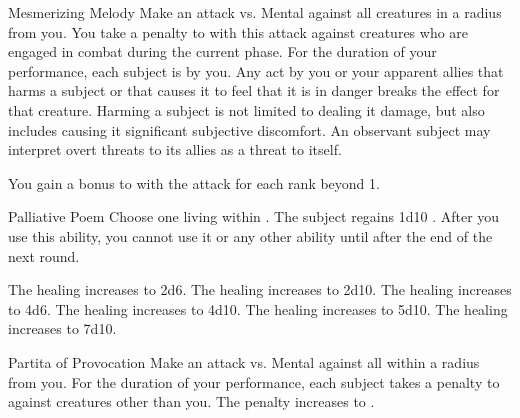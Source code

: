 {            \begin{durationability}{Mesmerizing Melody}
                \rankline
                Make an attack vs. Mental against all creatures in a \largearea radius from you.
                You take a  penalty to  with this attack against creatures who are engaged in combat during the current phase.
                \hit For the duration of your performance, each subject is \fascinated by you.
                Any act by you or your apparent allies that harms a subject or that causes it to feel that it is in danger breaks the effect for that creature.
                Harming a subject is not limited to dealing it damage, but also includes causing it significant subjective discomfort.
                An observant subject may interpret overt threats to its allies as a threat to itself.

                \rankline
                You gain a  bonus to  with the attack for each rank beyond 1.
            \end{durationability}

            \begin{instantability}{Palliative Poem}
                \rankline
                Choose one living  within \shortrange.
                The subject regains 1d10 \add {} .
                After you use this ability, you cannot use it or any other  ability until after the end of the next round.

                \rankline
                 The healing increases to 2d6.
                 The healing increases to 2d10.
                 The healing increases to 4d6.
                 The healing increases to 4d10.
                 The healing increases to 5d10.
                 The healing increases to 7d10.
            \end{instantability}

            \begin{durationability}{Partita of Provocation}
                \rankline
                Make an attack vs. Mental against all  within a \largearea radius from you.
                \hit For the duration of your performance, each subject takes a  penalty to  against creatures other than you.
                \crit The penalty increases to .


\end{durationability}}
